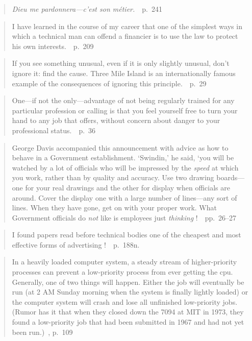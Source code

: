 \documentclass[a4paper]{article}
\begin{document}
\medskip
\begin{quote}
	\emph{Dieu me pardonnera---c'est son
	m\'{e}tier.}~\cite{Swindin1962}~p.~241
\end{quote}

\medskip
\begin{quote}
	I have learned in the course of my career that one of the
	simplest ways in which a technical man can offend a
	financier is to use the law to protect his own
	interests.~\cite{Swindin1962}~p.~209
\end{quote}

\medskip
\begin{quote}
	If you see something unusual, even if it is only slightly
	unusual, don't ignore it: find the cause.  Three Mile Island
	is an internationally famous example of the consequences of
	ignoring this principle.~\cite{Gans1991}~p.~29
\end{quote}

\medskip
\begin{quote}
	One---if not the only---advantage of not being regularly trained
	for any particular profession or calling is that you feel yourself
	free to turn your hand to any job that offers, without concern
	about danger to your professional
	status.~\cite{Swindin1962}~p.~36
\end{quote}

\medskip
\begin{quote}
	George Davis accompanied this announcement with advice as how to
	behave in a Government establishment. `Swindin,' he said, `you
	will be watched by a lot of officials who will be impressed by
	the \emph{speed} at which you work, rather than by quality and
	accuracy.  Use two drawing boards---one for your real drawings
	and the other for display when officials are around.  Cover the
	display one with a large number of lines---any sort of lines.
	When they have gone, get on with your proper work.  What Government
	officials do \emph{not} like is employees just
	\emph{thinking} !~\cite{Swindin1962}~pp.~26--27
\end{quote}

\medskip
\begin{quote}
	I found papers read before technical bodies one of the
	cheapest and most effective forms of
	advertising !~\cite{Swindin1962}~p.~188n.
\end{quote}

\medskip
\begin{quote}
	In a heavily loaded computer system, a steady stream of
	higher-priority processes can prevent a low-priority process
	from ever getting the cpu.  Generally, one of two things will
	happen.  Either the job will eventually be run (at 2 AM Sunday
	morning when the system is finally lightly loaded) or the
	computer system will crash and lose all unfinished low-priority
	jobs.  (Rumor has it that when they closed down the 7094 at
	MIT in 1973, they found a low-priority job that had been
	submitted in 1967 and had not yet been run.)~\cite{Peterson1983},
	p.~109
\end{quote}
\end{document}
